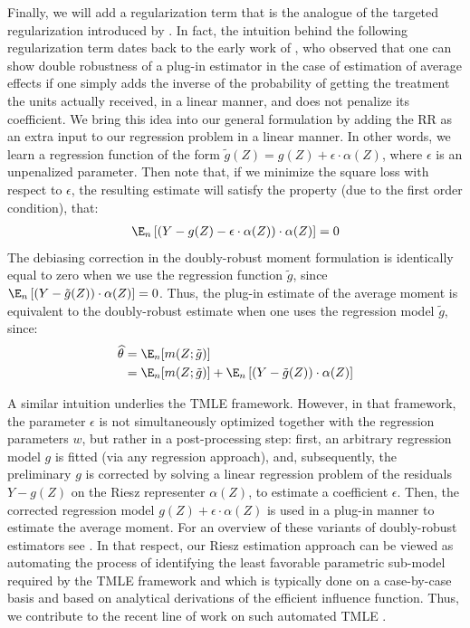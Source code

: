 \documentclass[nohyperref]{article}
\theoremstyle{plain}
\theoremstyle{definition}
\theoremstyle{remark}
\begin{document}
Finally, we will add a regularization term that is the analogue of the targeted regularization introduced by \citet{shi2019adapting}. In fact, the intuition behind the following regularization term dates back to the early work of \citet{bang2005doubly}, who observed that one can show double robustness of a plug-in estimator in the case of estimation of average effects if one simply adds the inverse of the probability of getting the treatment the units actually received, in a linear manner, and does not penalize its coefficient. We bring this idea into our general formulation by adding the RR as an extra input to our regression problem in a linear manner. In other words, we learn a regression function of the form $\tilde{g}(Z) = g(Z) + \epsilon\cdot \alpha(Z)$, where $\epsilon$ is an unpenalized parameter. Then note that, if we minimize the square loss with respect to $\epsilon$, the resulting estimate will satisfy the property (due to the first order condition), that:
\begin{align*}
    \E_n\left[(Y - g(Z) - \epsilon\cdot \alpha(Z))\cdot \alpha(Z)\right] = 0
\end{align*}
The debiasing correction in the doubly-robust moment formulation is identically equal to zero when we use the regression function $\tilde{g}$, since
$\E_n\left[(Y - \tilde{g}(Z))\cdot \alpha(Z)\right] = 0$.
Thus, the plug-in estimate of the average moment is equivalent to the doubly-robust estimate when one uses the regression model $\tilde{g}$, since:
\begin{align*}
    \widehat{\theta} & = \E_n[m(Z; \tilde{g})] \\ & = \E_n[m(Z;\tilde{g})] + \E_n\left[(Y - \tilde{g}(Z))\cdot \alpha(Z)\right]
\end{align*}

A similar intuition underlies the TMLE framework. However, in that framework, the parameter $\epsilon$ is not simultaneously optimized together with the regression parameters $w$, but rather in a post-processing step: first, an arbitrary regression model $g$ is fitted (via any regression approach), and, subsequently, the preliminary $g$ is corrected by solving a linear regression problem of the residuals $Y - g(Z)$ on the Riesz representer $\alpha(Z)$, to estimate a coefficient $\epsilon$. Then, the corrected regression model $g(Z) + \epsilon\cdot \alpha(Z)$ is used in a plug-in manner to estimate the average moment. For an overview of these variants of doubly-robust estimators see \citet{tran2019double}. In that respect, our Riesz estimation approach can be viewed as automating the process of identifying the least favorable parametric sub-model required by the TMLE framework and which is typically done on a case-by-case basis and based on analytical derivations of the efficient influence function. Thus, we contribute to the recent line of work on such automated TMLE \citep{carone2019}.
\end{document}

